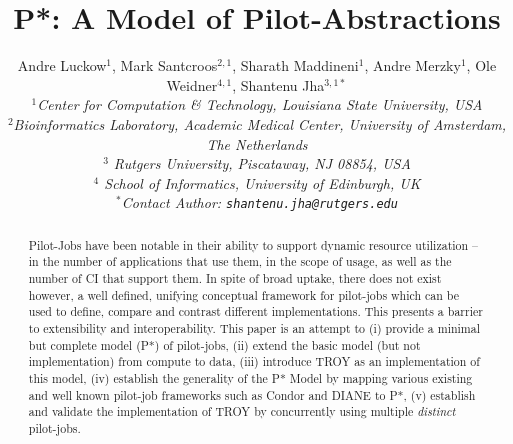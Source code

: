 \documentclass[conference,final]{IEEEtran}
\title{P*: A Model of Pilot-Abstractions}
\date{}
\newcommand{\alnote}[1]{ {\textcolor{blue} { ***andre: #1 }}}
\newcommand{\alnote}[1]{}
\newcommand{\up}{\vspace*{-1em}}
\newcommand{\upp}{\vspace*{-0.5em}}
\begin{document}
\ifpdf
{}
\else
{}
\fi

\author{
  Andre Luckow$^{1}$, Mark Santcroos$^{2,1}$, Sharath Maddineni$^{1}$, Andre Merzky$^{1}$, Ole Weidner$^{4,1}$, Shantenu Jha$^{3,1*}$\\
  \small{\emph{$^{1}$Center for Computation \& Technology, Louisiana State University, USA}}\\
  \small{\emph{$^{2}$Bioinformatics Laboratory, Academic Medical Center, University of Amsterdam, The Netherlands}}\\
  \small{\emph{$^{3}$ Rutgers University, Piscataway, NJ 08854, USA}}\\
  \small{\emph{$^{4}$ School of Informatics, University of Edinburgh, UK }}\\  
  \small{\emph{$^{*}$Contact Author: \texttt{shantenu.jha@rutgers.edu}}}\\
  \up\up\up\up }

\maketitle

\begin{abstract}
  \up %
  Pilot-Jobs have been notable in their ability to support dynamic
  resource utilization -- in the number of applications that use them,
  in the scope of usage, as well as the number of CI that support
  them.  In spite of broad uptake, there does not exist however, a
  well defined, unifying conceptual framework for pilot-jobs which can
  be used to define, compare and contrast different
  implementations. This presents a barrier to extensibility and
  interoperability. This paper is an attempt to (i) provide a minimal
  but complete model (P*) of pilot-jobs, (ii) extend the basic model
  (but not implementation) from compute to data, (iii) introduce TROY
  as an implementation of this model, %
  (iv) establish the generality of the P* Model by mapping various
  existing and well known pilot-job frameworks such as Condor and
  DIANE to P*, (v) establish and validate the implementation of TROY
  by concurrently using multiple {\it distinct} pilot-jobs. \upp\upp\upp\upp
\end{abstract}
\end{document}
